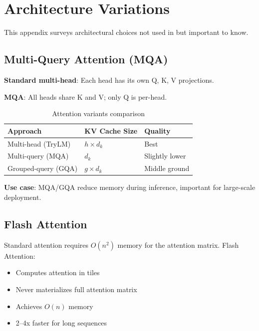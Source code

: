 \chapter{Architecture Variations}
\label{app:architecture-variations}

This appendix surveys architectural choices not used in \TryLM but important to know.

\section{Multi-Query Attention (MQA)}

\textbf{Standard multi-head}: Each head has its own Q, K, V projections.

\textbf{MQA}: All heads share K and V; only Q is per-head.

\begin{table}[H]
\centering
\begin{tabular}{lll}
\toprule
\textbf{Approach} & \textbf{KV Cache Size} & \textbf{Quality} \\
\midrule
Multi-head (TryLM) & $h \times d_k$ & Best \\
Multi-query (MQA) & $d_k$ & Slightly lower \\
Grouped-query (GQA) & $g \times d_k$ & Middle ground \\
\bottomrule
\end{tabular}
\caption{Attention variants comparison}
\end{table}

\textbf{Use case}: MQA/GQA reduce memory during inference, important for large-scale deployment.

\section{Flash Attention}

Standard attention requires $O(n^2)$ memory for the attention matrix. Flash Attention:
\begin{itemize}
    \item Computes attention in tiles
    \item Never materializes full attention matrix
    \item Achieves $O(n)$ memory
    \item 2--4x faster for long sequences
\end{itemize}

